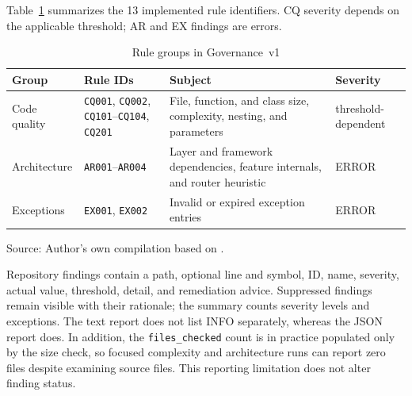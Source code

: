 Table~\ref{tab:quality-rule-groups} summarizes the 13 implemented rule
identifiers. CQ severity depends on the applicable threshold; AR and EX
findings are errors.

\begin{table}[H]
  \centering
  \scriptsize
  \renewcommand{\arraystretch}{1.08}
  \caption{Rule groups in Governance~v1}
  \label{tab:quality-rule-groups}
  \begin{tabularx}{\textwidth}{@{}p{}p{}>{\raggedright\arraybackslash}X p{}@{}}
    \toprule
    \textbf{Group} & \textbf{Rule IDs} & \textbf{Subject} &
      \textbf{Severity} \\
    \midrule
    Code quality & \texttt{CQ001}, \texttt{CQ002},
      \texttt{CQ101}--\texttt{CQ104}, \texttt{CQ201} & File, function,
      and class size, complexity, nesting, and parameters & threshold-dependent \\
    Architecture & \texttt{AR001}--\texttt{AR004} & Layer and framework
      dependencies, feature internals, and router heuristic & ERROR \\
    Exceptions & \texttt{EX001}, \texttt{EX002} & Invalid or expired
      exception entries & ERROR \\
    \bottomrule
  \end{tabularx}
  \smallskip
  {\footnotesize Source: Author's own compilation based on
  \textcite{kleiveist2026quality-implementation}.\par}
\end{table}

Repository findings contain a path, optional line and symbol, ID, name,
severity, actual value, threshold, detail, and remediation advice. Suppressed
findings remain visible with their rationale; the summary counts severity
levels and exceptions. The text report does not list INFO separately, whereas
the JSON report does. In addition, the \texttt{files\_checked} count is in
practice populated only by the size check, so focused complexity and
architecture runs can report zero files despite examining source files. This
reporting limitation does not alter finding status.
